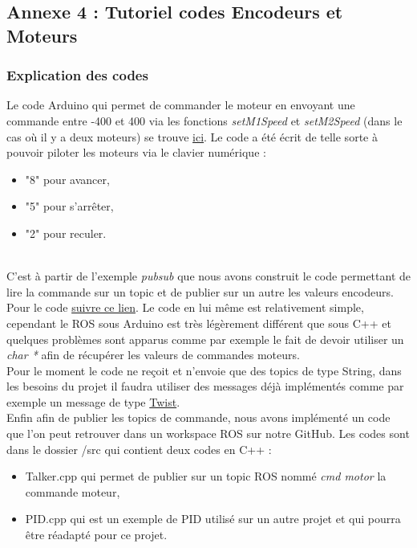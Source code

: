 \documentclass[french]{rapportENSTAB}
\begin{document}
\subsection{Annexe 4 : Tutoriel codes Encodeurs et Moteurs} \label{annexe4}
\subsubsection{Explication des codes}

Le code Arduino qui permet de commander le moteur en envoyant une commande entre -400 et 400 via les fonctions \textit{setM1Speed} et \textit{setM2Speed} (dans le cas où il y a deux moteurs) se trouve \href{https://github.com/AntoninLize/Projet_OrangeLabs/tree/master/Code/Arduino/Commande_moteur}{ici}. Le code a été écrit de telle sorte à pouvoir piloter les moteurs via le clavier numérique : \begin{itemize}[label=\textbullet, font=\small\color{blue}]
    \item "8" pour avancer,
    \item "5" pour s'arrêter,
    \item "2" pour reculer.
\end{itemize}\\

C'est à partir de l'exemple \textit{pubsub} que nous avons construit le code permettant de lire la commande sur un topic et de publier sur un autre les valeurs encodeurs. Pour le code \href{https://github.com/AntoninLize/Projet_OrangeLabs/tree/master/Code/Arduino/pubsub}{suivre ce lien}. Le code en lui même est relativement simple, cependant le ROS sous Arduino est très légèrement différent que sous C++ et quelques problèmes sont apparus comme par exemple le fait de devoir utiliser un \textit{char *} afin de récupérer les valeurs de commandes moteurs.\\

Pour le moment le code ne reçoit et n'envoie que des topics de type String, dans les besoins du projet il faudra utiliser des messages déjà implémentés comme par exemple un message de type \href{http://docs.ros.org/api/geometry_msgs/html/msg/Twist.html}{Twist}.\\

Enfin afin de publier les topics de commande, nous avons implémenté un code que l'on peut retrouver dans un workspace ROS sur notre GitHub. Les codes sont dans le dossier /src qui contient deux codes en C++ : 
\begin{itemize}[label=\textbullet, font=\small\color{blue}]
    \item Talker.cpp qui permet de publier sur un topic ROS nommé \textit{cmd motor} la commande moteur,
    \item PID.cpp qui est un exemple de PID utilisé sur un autre projet et qui pourra être réadapté pour ce projet.
\end{itemize}\\
\end{document}
